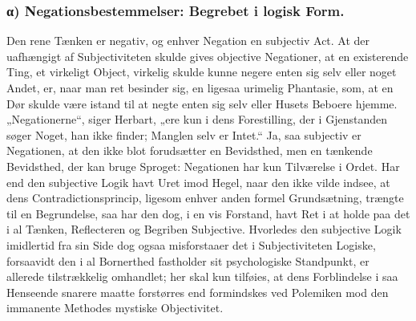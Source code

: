 \documentclass[11pt]{book}
\begin{document}
\subsubsection*{α) Negationsbestemmelser: Begrebet i logisk Form.}
Den rene Tænken er negativ, og enhver Negation en subjectiv Act. At der
uafhængigt af Subjectiviteten skulde gives objective Negationer, at en
existerende Ting, et virkeligt Object, virkelig skulde kunne negere enten
sig selv eller noget Andet, er, naar man ret besinder sig, en ligesaa
urimelig Phantasie, som, at en Dør skulde være istand til at negte enten
sig selv eller Husets Beboere hjemme. „Negationerne“, siger Herbart, „ere
kun i dens Forestilling, der i Gjenstanden søger Noget, han ikke finder;
Manglen selv er Intet.“ Ja, saa subjectiv er Negationen, at den ikke blot
forudsætter en Bevidsthed, men en tænkende Bevidsthed, der kan bruge
Sproget: Negationen har kun Tilværelse i Ordet. Har end den subjective
Logik havt Uret imod Hegel, naar den ikke vilde indsee, at dens
Contradictionsprincip, ligesom enhver anden formel Grundsætning, trængte
til en Begrundelse, saa har den dog, i en vis Forstand, havt Ret i at
holde paa det i al Tænken, Reflecteren og Begriben Subjective. Hvorledes
den subjective Logik imidlertid fra sin Side dog ogsaa misforstaaer det i
Subjectiviteten Logiske, forsaavidt den i al Bornerthed fastholder sit
psychologiske Standpunkt, er allerede tilstrækkelig omhandlet; her skal
kun tilføies, at dens Forblindelse i saa Henseende snarere maatte
forstørres end formindskes ved Polemiken mod den immanente Methodes
mystiske Objectivitet.
\end{document}
